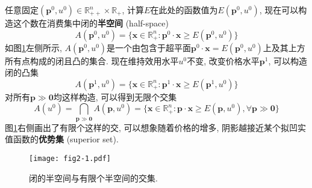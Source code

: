\documentclass[cn, 12pt, math=mtpro2, bibstyle=apa, blue]{elegantbook}
\newcommand{\R}{\mathbb{R}}
\newcommand{\p}{\mathbf{p}}
\newcommand{\x}{\mathbf{x}}
\begin{document}
任意固定$(\p^0,u^0)\in\R_{++}^n\times\R_+$, 计算$E$在此处的函数值为$E(\p^0,u^0)$, 现在可以构造这个数在消费集中闭的\textbf{半空间} (half-space)
$$A(\p^0,u^0)=\{\x\in\R_+^n: \p^0\cdot\x\ge E(\p^0,u^0)\}$$
如图\ref{fig2.1}左侧所示, $A(\p^0,u^0)$是一个由包含于超平面$\p^0\cdot\x=E(\p^0,u^0)$上及其上方所有点构成的闭且凸的集合. 现在维持效用水平$u^0$不变, 改变价格水平$\p^1$, 可以构造闭的凸集
$$A(\p^1,u^0)=\{\x\in\R_+^n: \p^1\cdot\x\ge E(\p^1,u^0)\}$$
对所有$\p\gg\mathbf{0}$均这样构造, 可以得到无限个交集
\begin{equation}\label{eq2.1}
  A(u^0)=\bigcap_{\p\gg\mathbf{0}}A(\p,u^0)=\{\x\in\R_+^n: \p\cdot\x\ge E(\p,u^0),\forall\p\gg\mathbf{0}\}
\end{equation}
图\ref{fig2.1}右侧画出了有限个这样的交, 可以想象随着价格的增多, 阴影越接近某个拟凹实值函数的\textbf{优势集} (superior set).
\begin{figure}[htbp!]
  \centering
  \texttt{[image: fig2-1.pdf]}
  \caption{闭的半空间与有限个半空间的交集.}\label{fig2.1}
\end{figure}
\end{document}
